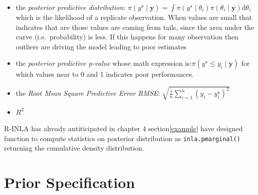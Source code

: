 \documentclass[
  12pt,
  a4paper,
  oneside]{book}
\newcommand{\passthrough}[1]{#1}
\providecommand{\tightlist}{%
  \setlength{\itemsep}{0pt}\setlength{\parskip}{0pt}}
\theoremstyle{definition}
\theoremstyle{definition}
\theoremstyle{definition}
\theoremstyle{remark}
\begin{document}
\begin{itemize}
\tightlist
\item
  the \emph{posterior predictive distribution}: \(\pi(y^{\star} \mid \boldsymbol{y}) = \int \pi(y^{\star} \mid \theta_{i})\pi({\theta_{i}} \mid \boldsymbol{y})\mathrm{d}\theta_{i}\) which is the likelihood of a replicate observation. When values are small that indicates that are those values are coming from tails, since the area under the curve (i.e.~probability) is less. If this happens for many observation then outliers are driving the model leading to poor estimates
\item
  the \emph{posterior predictive p-value} whose math expression is:\(\pi(y^{\star} \leq y_{i} \mid \boldsymbol{y})\) for which values near to 0 and 1 indicates poor performances.
\item
  the \emph{Root Mean Square Predictive Error RMSE}: \(\sqrt{\frac{1}{n} \sum_{i=1}^{n}(y_{i}-{y}^{\star}_{i})^{2}}\)
\item
  \(R^2\)
\end{itemize}

R-INLA has already antiticipated in chapter 4 section\ref{example} have designed function to compute statistics on posterior distribution as \passthrough{\lstinline!inla.pmarginal()!} returning the cumulative density distribution.

\hypertarget{priorsspec}{%
\section{Prior Specification}\label{priorsspec}}
\end{document}

